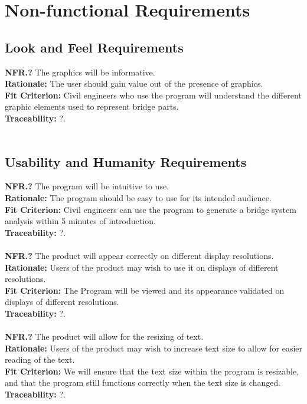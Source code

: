 \documentclass[12pt]{article}
\begin{document}
\section{Non-functional Requirements}

\subsection{Look and Feel Requirements}

  \textbf{NFR.?} The graphics will be informative.\\
  \textbf{Rationale:} The user should gain value out of the presence of graphics.\\
  \textbf{Fit Criterion:} Civil engineers who use the program will understand the different graphic elements used to represent bridge parts.\\
  \textbf{Traceability:} ?.\\\\

\subsection{Usability and Humanity Requirements}

  \textbf{NFR.?} The program will be intuitive to use.\\
  \textbf{Rationale:} The program should be easy to use for its intended audience.\\
  \textbf{Fit Criterion:} Civil engineers can use the program to generate a bridge system analysis within 5 minutes of introduction.\\
  \textbf{Traceability:} ?.\\\\

  \noindent\textbf{NFR.?} The product will appear correctly on different display resolutions.\\
  \textbf{Rationale:} Users of the product may wish to use it on displays of different resolutions.\\
  \textbf{Fit Criterion:} The Program will be viewed and its appearance validated on displays of different resolutions.\\
  \textbf{Traceability:} ?.\\\\

  \noindent\textbf{NFR.?} The product will allow for the resizing of text.\\
  \textbf{Rationale:} Users of the product may wish to increase text size to allow for easier reading of the text.\\
  \textbf{Fit Criterion:} We will ensure that the text size within the program is resizable, and that the program still functions correctly when the text size is changed.\\
  \textbf{Traceability:} ?.\\\\
\end{document}
